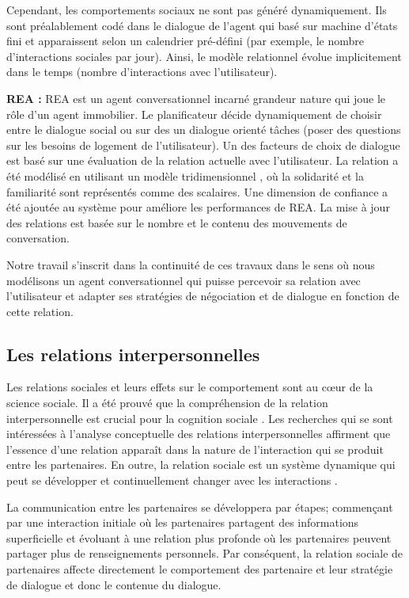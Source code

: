 \documentclass[a4paper,french]{article}
\begin{document}
\par Cependant, les comportements sociaux ne sont pas généré dynamiquement. Ils sont préalablement codé dans le dialogue de l'agent qui basé sur machine d'états fini et apparaissent selon un calendrier pré-défini (par exemple, le nombre d'interactions sociales par jour). Ainsi, le modèle relationnel évolue implicitement dans le temps (nombre d'interactions avec l'utilisateur).


\par \textbf{REA : } REA \cite{bickmore2005establishing} est un agent conversationnel incarné grandeur nature qui joue le rôle d'un agent immobilier. Le planificateur décide dynamiquement  de choisir entre le dialogue social  ou sur des un dialogue orienté tâches (poser des questions sur les besoins de logement de l'utilisateur). Un des facteurs de choix de dialogue est basé sur une évaluation de la relation actuelle avec l'utilisateur. La relation a été modélisé en utilisant un modèle tridimensionnel \cite{svennevig2000getting}, où la solidarité et la familiarité sont représentés comme des scalaires. Une dimension de confiance a été ajoutée au système pour améliore les performances de REA. La  mise à jour des  relations est basée sur le nombre et le contenu des mouvements de conversation.

\par Notre travail s'inscrit dans la continuité de ces travaux dans le sens où nous modélisons un agent conversationnel qui puisse percevoir sa relation avec l'utilisateur et adapter ses stratégies de négociation et de dialogue en fonction de cette relation. 

\subsection{Les relations interpersonnelles}
\par Les relations sociales et leurs effets sur le comportement sont au cœur de la science sociale. Il a été prouvé que la compréhension de la relation interpersonnelle est crucial pour la cognition sociale \cite{reis2000relationship}. Les recherches qui se sont intéressées à l'analyse conceptuelle des relations interpersonnelles affirment que l'essence d'une relation apparaît dans la nature de l'interaction qui se produit entre les partenaires. En outre, la relation sociale est un système dynamique qui peut se développer et continuellement changer avec les interactions \cite {reis2000relationship,svennevig2000getting}.
\par La communication entre les partenaires se développera par étapes; commençant par une interaction initiale où les partenaires partagent des informations superficielle et évoluant à une relation plus profonde où les partenaires peuvent partager plus de renseignements personnels. Par conséquent, la relation sociale de partenaires affecte directement le comportement des partenaire et leur stratégie de dialogue et donc le contenue du dialogue.
\end{document}
